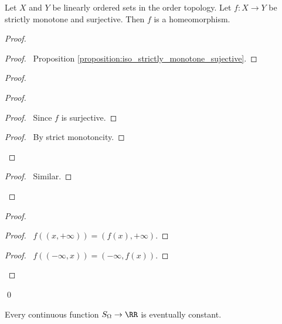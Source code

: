 \begin{proposition}
    \label{proposition:homeomorphism_order_topology}
    Let $X$ and $Y$ be linearly ordered sets in the order topology. Let $f : X \rightarrow Y$ be strictly monotone and surjective. Then $f$ is a homeomorphism.
\end{proposition}

\begin{proof}
    \pf
    \begin{proof}
        \pf\ Proposition \ref{proposition:iso_strictly_monotone_sujective}.
    \end{proof}
    \begin{proof}
        \begin{proof}
            \begin{proof}
                \pf\ Since $f$ is surjective.
            \end{proof}
            \begin{proof}
                \pf\ By strict monotoncity.
            \end{proof}
        \end{proof}
        \begin{proof}
            \pf\ Similar.
        \end{proof}
    \end{proof}
    \begin{proof}
        \begin{proof}
            \pf\ $f((x, +\infty)) = (f(x), +\infty)$.
        \end{proof}
        \begin{proof}
            \pf\ $f((-\infty, x)) = (-\infty, f(x))$.
        \end{proof}
    \end{proof}
    \qed
\end{proof}

\begin{proposition}
    Every continuous function $S_\Omega \rightarrow \RR$
    is eventually constant.
\end{proposition}

